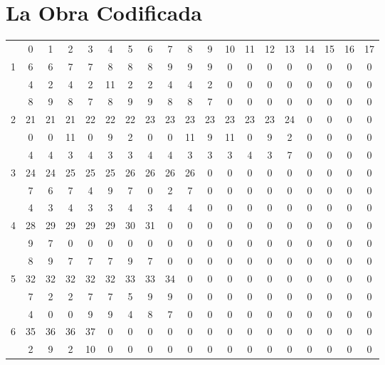 \documentclass[letterpaper,12pt]{book}
\theoremstyle{definition} \newtheorem{Def}{Definición}[chapter]
\theoremstyle{definition} \newtheorem{Teo}{Teorema}[chapter]
\theoremstyle{definition} \newtheorem{Pro}{Proposición}[chapter]
\theoremstyle{definition} \newtheorem{Lema}{Lema}[chapter]
\begin{document}
\appendix

\chapter{La Obra Codificada}\label{Obra}
\begin{table}[h]
\centering
{\tiny
\begin{tabular}{ c c c c c c c c c c c c c c c c c c c}
& 0 & 1 & 2 & 3 & 4 & 5 & 6 & 7 & 8 & 9 & 10 & 11 & 12 & 13 & 14 & 15 & 16 & 17 \\ 
1 & 6 & 6 & 7 & 7 & 8 & 8 & 8 & 9 & 9 & 9 & 0 & 0 & 0 & 0 & 0 & 0 & 0 & 0 \\ %
 & 4 & 2 & 4 & 2 & 11 & 2 & 2 & 4 & 4 & 2 & 0 & 0 & 0 & 0 & 0 & 0 & 0 & 0 \\ %
 & 8 & 9 & 8 & 7 & 8 & 9 & 9 & 8 & 8 & 7 & 0 & 0 & 0 & 0 & 0 & 0 & 0 & 0 \\%
2 & 21 & 21 & 21& 22 & 22 & 22 & 23 & 23 & 23 & 23 & 23 & 23 & 23 & 24 & 0 & 0 & 0 & 0\\%
 & 0 & 0 & 11 & 0 & 9 & 2 & 0 & 0 & 11 & 9 & 11 & 0 & 9 & 2 & 0 & 0 & 0 & 0 \\ %
 & 4 & 4 & 3 & 4 & 3 & 3 & 4 & 4 & 3 & 3 & 3 & 4 & 3 & 7 & 0 & 0 & 0 & 0 \\ %
3 & 24 & 24 & 25 & 25 & 25 & 26 & 26 & 26 & 26 & 0 & 0 & 0 & 0 & 0 & 0 & 0 & 0 & 0 \\  %
 & 7 & 6 & 7 & 4 & 9 & 7 & 0 & 2 & 7 & 0 & 0 & 0 & 0 & 0 & 0 & 0 & 0 & 0 \\  %
 & 4 & 3 & 4 & 3 & 3 & 4 & 3 & 4 & 4 & 0 & 0 & 0 & 0 & 0 & 0 & 0 & 0 & 0 \\  %
4 & 28 & 29 & 29 & 29 & 29 & 30 & 31& 0 & 0 & 0 & 0 & 0 & 0 & 0 & 0 & 0 & 0 & 0 \\  %
 & 9 & 7 & 0 & 0 & 0 & 0 & 0 & 0 & 0 & 0 & 0 & 0 & 0 & 0 & 0 & 0 & 0 & 0 \\  %
 & 8 & 9 & 7 & 7 & 7 & 9 & 7 & 0 & 0 & 0 & 0 & 0 & 0 & 0 & 0 & 0 & 0 & 0 \\  %
5 & 32 & 32 & 32 & 32 & 32 & 33 & 33 & 34 & 0 & 0 & 0 & 0 & 0 & 0 & 0 & 0 & 0 & 0 \\  %
 & 7 & 2 & 2 & 7 & 7 & 5 & 9 & 9 & 0 & 0 & 0 & 0 &  0 & 0 & 0 & 0 & 0 & 0 \\  %
 & 4 & 0 & 0 & 9 & 9 & 4 & 8 & 7 & 0 & 0 & 0 & 0 & 0 & 0 & 0 & 0 & 0 & 0 \\  %
6 & 35 & 36 & 36 & 37 & 0 & 0 & 0 & 0 & 0 & 0 & 0 & 0 & 0 & 0 & 0 & 0 & 0 & 0 \\  %
 & 2 & 9 & 2 &10 & 0 & 0 & 0 & 0 & 0 & 0 & 0 & 0 & 0 & 0 & 0 & 0 & 0 & 0 \\  %

\end{tabular}}
\end{table}
\end{document}
